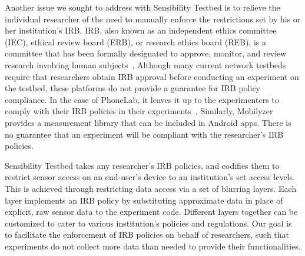 Another issue we sought to address with Sensibility Testbed is to 
relieve the individual researcher of the need to manually enforce 
the restrictions set by his or her institution's IRB.
IRB, also known as an independent ethics committee (IEC), ethical 
review board (ERB), or research ethics board (REB), is a committee 
that has been formally designated to approve, monitor, and review 
research involving human subjects~\cite{irb}. Although many current network 
testbeds require that researchers obtain IRB approval before conducting
an experiment on the testbed, these platforms do not provide a guarantee 
for IRB policy compliance. In the case of PhoneLab, 
it leaves it up to the experimenters to comply with their IRB policies in their 
experiments~\cite{nandugudi2013phonelab}. Similarly, 
Mobilyzer~\cite{nikravesh2015mobilyzer} provides a measurement
library that can be included in Android apps. 
There is no guarantee that an 
experiment will be compliant with the researcher's IRB policies.

Sensibility Testbed takes any researcher's IRB policies, and codifies 
them to restrict sensor access on an end-user's device to 
an institution's set access levels. 
This is achieved through restricting data access  via
a set of blurring layers. Each layer implements an IRB policy by substituting 
approximate data in place of explicit, raw sensor data to the experiment code. Different layers 
together can be customized to cater to various institution's 
policies and regulations. Our goal is to facilitate the enforcement of 
IRB policies on behalf of researchers, such that experiments 
do not collect more data than needed to provide their functionalities.